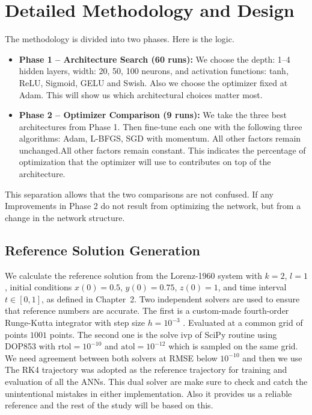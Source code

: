 \section{Detailed Methodology and Design}

The methodology is divided into two phases. Here is the logic.

\begin{itemize}
    \item \textbf{Phase 1 -- Architecture Search (60 runs):} We choose the depth: 1--4 hidden layers, width: 20, 50, 100 neurons, and activation functions: tanh, ReLU, Sigmoid, GELU and Swish. Also we choose the optimizer fixed at Adam. This will show us which architectural choices matter most.
    \item \textbf{Phase 2 -- Optimizer Comparison (9 runs):} We take the three best architectures from Phase 1. Then fine-tune each one with the following three algorithms: Adam, L-BFGS, SGD with momentum. All other factors remain unchanged.All other factors remain constant. This indicates the percentage of optimization that the optimizer will use to
contributes on top of the architecture.

\end{itemize}

This separation allows that the two comparisons are not confused. If any
Improvements in Phase 2 do not result from optimizing the network, but from a change in the network structure.


\subsection{Reference Solution Generation}

We calculate the reference solution from the Lorenz-1960 system with $k=2$, $l=1$, initial conditions $x(0)=0.5$, $y(0)=0.75$, $z(0)=1$, and time interval $t \in [0, 1]$, as defined in Chapter~2. Two independent solvers are used to ensure that reference numbers are accurate. The first is a custom-made fourth-order Runge-Kutta integrator with step size $h=10^{-3}$ . Evaluated at a common grid of points $1001$ points. The second one is the solve ivp of SciPy  routine using DOP853 with $\text{rtol}=10^{-10}$ and $\text{atol}=10^{-12}$ which is sampled on the same grid. We need agreement between both solvers at RMSE below $10^{-10}$ and then we use
The RK4 trajectory was adopted as the reference trajectory for training and evaluation of all the ANNs. This dual solver are make sure to check and catch the unintentional mistakes in either implementation. Also it provides us a reliable reference and the rest of the study will be based on this.

